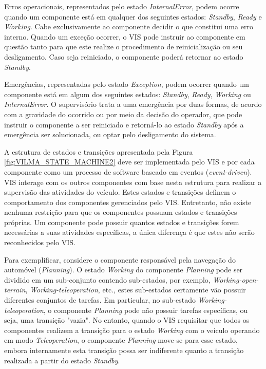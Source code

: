 \documentclass[conference]{IEEEtran}
\begin{document}
Erros operacionais, representados pelo estado \textit{InternalError}, podem ocorre quando um componente está em qualquer dos seguintes estados: \textit{Standby}, \textit{Ready} e \textit{Working}. Cabe exclusivamente ao componente decidir o que constitui uma erro interno. Quando um exceção ocorrer, o VIS pode instruir ao componente em questão tanto para que este realize o procedimento de reinicialização ou seu desligamento. Caso seja reiniciado, o componente poderá retornar ao estado \textit{Standby}.

Emergências, representadas pelo estado \textit{Exception}, podem ocorrer quando um componente está em algum dos seguintes estados: \textit{Standby}, \textit{Ready}, \textit{Working} ou \textit{InternalError}. O supervisório trata a uma emergência por duas formas, de acordo com a gravidade do ocorrido ou por meio da decisão do operador, que pode instruir o componente a ser reiniciado e retorná-lo ao estado \textit{Standby} após a emergência ser solucionada, ou optar pelo desligamento do sistema.

A estrutura de estados e transições apresentada pela Figura \ref{fig:VILMA_STATE_MACHINE2} deve ser implementada pelo VIS e por cada componente como um processo de software baseado em eventos (\textit{event-driven}).  VIS interage com os outros componentes com base nesta estrutura para realizar a supervisão das atividades do veículo. Estes estados e transições definem o comportamento dos componentes gerenciados pelo VIS. Entretanto, não existe nenhuma restrição para que os componentes possuam estados e transições próprias. Um componente pode possuir quantos estados e transições forem necessárias a suas atividades específicas, a única diferença é que estes não serão reconhecidos pelo VIS. 

Para exemplificar, considere o componente responsável pela navegação do automóvel (\textit{Planning}). O estado \textit{Working} do componente \textit{Planning} pode ser dividido em um sub-conjunto contendo sub-estados, por exemplo, \textit{Working-open-terrain}, \textit{Working-teleoperation}, etc., estes sub-estados certamente vão possuir diferentes conjuntos de tarefas. Em particular, no sub-estado \textit{Working-teleoperation}, o componente \textit{Planning} pode não possuir tarefas específicas, ou seja, uma transição "vazia". No entanto, quando o VIS requisitar que todos os componentes realizem a transição para o estado \textit{Working} com o veículo operando em modo \textit{Teleoperation}, o componente \textit{Planning} move-se para esse estado, embora internamente esta transição possa ser indiferente quanto a transição realizada a partir do estado \textit{Standby}.
\end{document}
